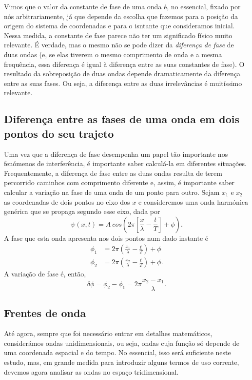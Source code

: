 Vimos que o valor da constante de fase de uma onda é, no essencial, fixado
por nós arbitrariamente, já que depende da escolha que fazemos para a posição da
origem do sistema de coordenadas e para o isntante que consideramos inicial.
Nessa medida, a constante de fase parece não ter um significado físico muito
relevante. É verdade, mas o mesmo não se pode dizer da \emph{diferença de fase}
de duas ondas (e, se elas tiverem o mesmo comprimento de onda e a mesma
frequência, essa diferença é igual à diferença entre as suas constantes de
fase). O resultado da sobreposição de duas ondas depende dramaticamente da
diferença entre as suas fases. Ou seja, a diferença entre as duas irrelevâncias
é muitíssimo relevante.

\subsection{Diferença entre as fases de uma onda em dois pontos do seu trajeto}
\label{sec:dfidx}
Uma vez que a diferença de fase desempenha um papel tão importante nos fenómenos
de interferência, é importante saber calculá-la em diferentes situações.
Frequentemente, a diferença de fase entre as duas ondas resulta de terem
percorrido caminhos com comprimento diferente e, assim, é importante saber
calcular a variação na fase de uma onda de um ponto para outro. 
Sejam $x_1$ e $x_2$ as coordenadas de dois pontos no eixo dos $x$ e consideremos
uma onda harmónica genérica que se propaga segundo esse eixo, dada por
\begin{equation*}
\psi(x,t)=A\
    cos\left(2\pi\left[\frac{x}{\lambda}-\frac{t}{T}\right]+\phi\right).
\end{equation*}
A fase que esta onda apresenta nos dois pontos num dado instante é
\begin{align*}
\phi_1&=2\pi\left(\frac{x_1}{\lambda}-\frac{t}{T}\right)+\phi\\
\phi_2&=2\pi\left(\frac{x_2}{\lambda}-\frac{t}{T}\right)+\phi.
\end{align*}
A variação de fase é, então,
\begin{equation*}
\delta\phi=\phi_2-\phi_1=2\pi\frac{x_2-x_1}{\lambda}.
\end{equation*}

\subsection{Frentes de onda}
Até agora, sempre que foi necessário entrar em detalhes matemáticos,
considerámos ondas unidimensionais, ou seja, ondas cuja função só depende de uma
coordenada espacial e do tempo. No essencial, isso será suficiente neste estudo,
mas, em grande medida para introduzir alguns termos de uso corrente, devemos
agora analisar as ondas no espaço tridimensional.

